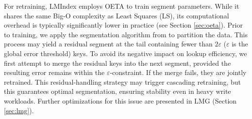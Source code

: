 
For retraining, LMIndex employs OETA to train segment parameters. While it shares the same Big-O complexity as Least Squares (LS), its computational overhead is typically significantly lower in practice (see Section \ref{sec:oeta}). Prior to training, we apply the segmentation algorithm from \cite{pgm20} to partition the data. This process may yield a residual segment at the tail containing fewer than $2\varepsilon$ ($\varepsilon$ is the global error threshold) keys. To avoid its negative impact on lookup efficiency, we first attempt to merge the residual keys into the next segment, provided the resulting error remains within the $\varepsilon$-constraint. If the merge fails, they are jointly retrained. This residual-handling strategy may trigger cascading retraining, but this guarantees optimal segmentation, ensuring stability even in heavy write workloads. Further optimizations for this issue are presented in LMG (Section \ref{sec:lmg}).


